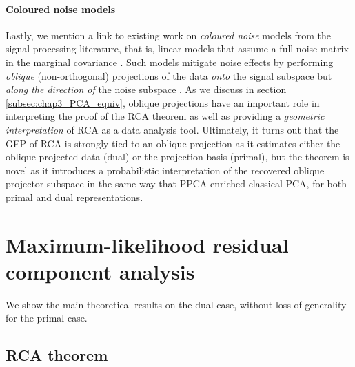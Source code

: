       \paragraph{Coloured noise models}	Lastly, we mention a link to existing work on \textit{coloured noise} models from the signal processing literature, that is, linear models that assume a full noise matrix in the marginal covariance \citep{Chen:subspace06, Hu:subspace03}. Such models mitigate noise effects by performing \emph{oblique} (non-orthogonal) projections of the data \emph{onto} the signal subspace but \textit{along the direction of} the noise subspace \citep{Behrens:signal94}. As we discuss in section \ref{subsec:chap3_PCA_equiv}, oblique projections have an important role in interpreting the proof of the RCA theorem as well as providing a \emph{geometric interpretation} of RCA as a data analysis tool. Ultimately, it turns out that the GEP of RCA is strongly tied to an oblique projection as it estimates either the oblique-projected data (dual) or the projection basis (primal), but the theorem is novel as it introduces a probabilistic interpretation of the recovered oblique projector subspace in 
the same way that PPCA enriched classical PCA, for both primal and dual representations.




  \section{Maximum-likelihood residual component analysis} \label{sec:chap3_optimising}

    We show the main theoretical results on the dual case, without loss of generality for the primal case.


    \subsection{RCA theorem} \label{subsec:chap3_RCAproof}

